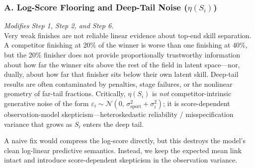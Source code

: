 \documentclass[12pt]{article}
\begin{document}
	\subsubsection*{A. Log-Score Flooring and Deep-Tail Noise ($\eta(S_i)$)}
	\emph{Modifies Step 1, Step 2, and Step 6.}\\
	Very weak finishes are not reliable linear evidence about top-end skill separation. A competitor finishing at 20\% of the winner is worse than one finishing at 40\%, but the 20\% finisher does not provide proportionally trustworthy information about how far the winner sits above the rest of the field in latent space---nor, dually, about how far that finisher sits below their own latent skill. Deep-tail results are often contaminated by penalties, stage failures, or the nonlinear geometry of far-tail fractions. Critically, $\eta(S_i)$ is \emph{not} competitor-intrinsic generative noise of the form $\varepsilon_i \sim \mathcal{N}(0,\, \sigma_{\mathrm{sport}}^2 + \sigma_i^2)$; it is score-dependent observation-model skepticism---heteroskedastic reliability / misspecification variance that grows as $S_i$ enters the deep tail.

	A naive fix would compress the log-score directly, but this destroys the model's clean log-linear predictive semantics. Instead, we keep the expected mean link intact and introduce score-dependent skepticism in the observation variance.
\end{document}
